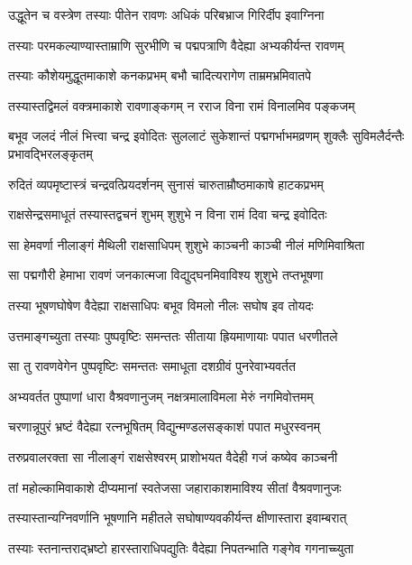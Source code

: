 \twolineshloka
{उद्धूतेन च वस्त्रेण तस्याः पीतेन रावणः}
{अधिकं परिबभ्राज गिरिर्दीप इवाग्निना} %

\twolineshloka
{तस्याः परमकल्याण्यास्ताम्राणि सुरभीणि च}
{पद्मपत्राणि वैदेह्या अभ्यकीर्यन्त रावणम्} %

\twolineshloka
{तस्याः कौशेयमुद्धूतमाकाशे कनकप्रभम्}
{बभौ चादित्यरागेण ताम्रमभ्रमिवातपे} %

\twolineshloka
{तस्यास्तद्विमलं वक्त्रमाकाशे रावणाङ्कगम्}
{न रराज विना रामं विनालमिव पङ्कजम्} %

\threelineshloka
{बभूव जलदं नीलं भित्त्वा चन्द्र इवोदितः}
{सुललाटं सुकेशान्तं पद्मगर्भाभमव्रणम्}
{शुक्लैः सुविमलैर्दन्तैः प्रभावद्भिरलङ्कृतम्} %

\twolineshloka
{रुदितं व्यपमृष्टास्त्रं चन्द्रवत्प्रियदर्शनम्}
{सुनासं चारुताम्रौष्ठमाकाषे हाटकप्रभम्} %

\twolineshloka
{राक्षसेन्द्रसमाधूतं तस्यास्तद्वचनं शुभम्}
{शुशुभे न विना रामं दिवा चन्द्र इवोदितः} %

\twolineshloka
{सा हेमवर्णा नीलाङ्गं मैथिली राक्षसाधिपम्}
{शुशुभे काञ्चनी काञ्ची नीलं मणिमिवाश्रिता} %

\twolineshloka
{सा पद्मगौरी हेमाभा रावणं जनकात्मजा}
{विद्युद्घनमिवाविश्य शुशुभे तप्तभूषणा} %

\twolineshloka
{तस्या भूषणघोषेण वैदेह्या राक्षसाधिपः}
{बभूव विमलो नीलः सघोष इव तोयदः} %

\twolineshloka
{उत्तमाङ्गच्युता तस्याः पुष्पवृष्टिः समन्ततः}
{सीताया ह्रियमाणायाः पपात धरणीतले} %

\twolineshloka
{सा तु रावणवेगेन पुष्पवृष्टिः समन्ततः}
{समाधूता दशग्रीवं पुनरेवाभ्यवर्तत} %

\twolineshloka
{अभ्यवर्तत पुष्पाणां धारा वैश्रवणानुजम्}
{नक्षत्रमालाविमला मेरुं नगमिवोत्तमम्} %

\twolineshloka
{चरणान्नूपुरं भ्रष्टं वैदेह्या रत्नभूषितम्}
{विद्युन्मण्डलसङ्काशं पपात मधुरस्वनम्} %

\twolineshloka
{तरुप्रवालरक्ता सा नीलाङ्गं राक्षसेश्वरम्}
{प्राशोभयत वैदेही गजं कष्येव काञ्चनी} %

\twolineshloka
{तां महोल्कामिवाकाशे दीप्यमानां स्वतेजसा}
{जहाराकाशमाविश्य सीतां वैश्रवणानुजः} %

\twolineshloka
{तस्यास्तान्यग्निवर्णानि भूषणानि महीतले}
{सघोषाण्यवकीर्यन्त क्षीणास्तारा इवाम्बरात्} %

\twolineshloka
{तस्याः स्तनान्तराद्भ्रष्टो हारस्ताराधिपद्युतिः}
{वैदेह्या निपतन्भाति गङ्गेव गगनाच्च्युता} %

